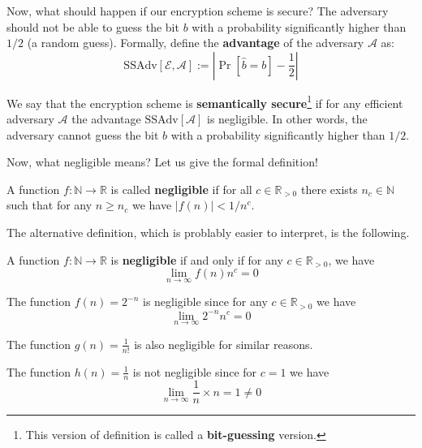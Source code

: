 \documentclass[../lecture-notes.tex]{subfiles}
\begin{document}
Now, what should happen if our encryption scheme is secure? The adversary should not be able to guess the bit $b$ with a probability significantly higher than $1/2$ (a random guess). Formally, define the 
\textbf{advantage} of the adversary $\mathcal{A}$ as:
\begin{equation}
    \text{SSAdv}[\mathcal{E}, \mathcal{A}] := \left| \Pr[\hat{b} = b] - \frac{1}{2} \right|
\end{equation}

We say that the encryption scheme is \textbf{semantically secure}\footnote{This version of definition is called a \textbf{bit-guessing} version.} if for any efficient adversary $\mathcal{A}$ the advantage $\text{SSAdv}[\mathcal{A}]$ is negligible. In other words, the adversary cannot guess the bit $b$ with a probability significantly higher than $1/2$.

Now, what negligible means? Let us give the formal definition!

\begin{definition}
    A function $f: \mathbb{N} \to \mathbb{R}$ is called \textbf{negligible} if for all $c \in \mathbb{R}_{>0}$ there exists $n_c \in \mathbb{N}$ such that for any $n \geq n_c$ we have $|f(n)| < 1/n^c$.
\end{definition}

The alternative definition, which is problably easier to interpret, is the following.

\begin{theorem}
    A function $f: \mathbb{N} \to \mathbb{R}$ is \textbf{negligible} if and only if for any $c \in \mathbb{R}_{>0}$, we have
    \begin{equation}
        \lim_{n \to \infty} f(n)n^c = 0
    \end{equation}
\end{theorem}

\begin{example}
    The function $f(n) = 2^{-n}$ is negligible since for any $c \in \mathbb{R}_{>0}$ we have
    \begin{equation}
        \lim_{n \to \infty} 2^{-n}n^c = 0
    \end{equation}

    The function $g(n) = \frac{1}{n!}$ is also negligible for similar reasons.
\end{example}

\begin{example}
    The function $h(n) = \frac{1}{n}$ is not negligible since for $c = 1$ we have
    \begin{equation}
        \lim_{n \to \infty} \frac{1}{n} \times n = 1 \neq 0
    \end{equation}
\end{example}
\end{document}

